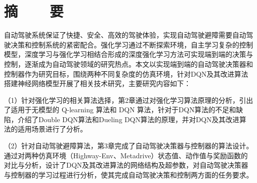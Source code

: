 %
%
%
%
%

\vspace*{-11mm}

\begin{center}
  \heiti{}\textbf{\thesisTitle}
\end{center}

\vspace*{2mm}

{\let\clearpage\relax \chapter*{\textmd{摘~~~~要}}}
\setcounter{page}{1}

\vspace*{1mm}

\setlength{\parskip}{0em}

自动驾驶系统保证了快捷、安全、高效的驾驶体验，实现自动驾驶避障需要自动驾驶决策和控制系统的紧密配合。强化学习通过不断探索环境，自主学习复杂的控制模型，深度学习与强化学习相结合形成的深度强化学习方法可实现端到端的决策与控制，逐渐成为自动驾驶领域的研究热点。本文以实现端到端的自动驾驶决策器和控制器作为研究目标，围绕两种不同复杂度的仿真环境，针对DQN及其改进算法搭建神经网络模型开展了相关技术研究，主要研究内容如下：

（1）针对强化学习的相关算法选择，第2章通过对强化学习算法原理的分析，引出了适用于无模型的 Q-learning 算法和 DQN 算法，针对于DQN算法的不足和缺陷，介绍了Double DQN算法和Dueling DQN算法的原理，并对DQN及其改进算法的适用场景进行了分析。

（2）针对自动驾驶避障算法，第3章完成了自动驾驶决策器与控制器的算法设计。通过对两种仿真环境（Highway-Env、Metadrive）状态值、动作值与奖励函数的对比与分析，设计了DQN及其改进算法的网络结构及超参数，对自动驾驶决策器与控制器的学习过程进行分析，使其完成自动驾驶决策和控制两方面的任务要求。

